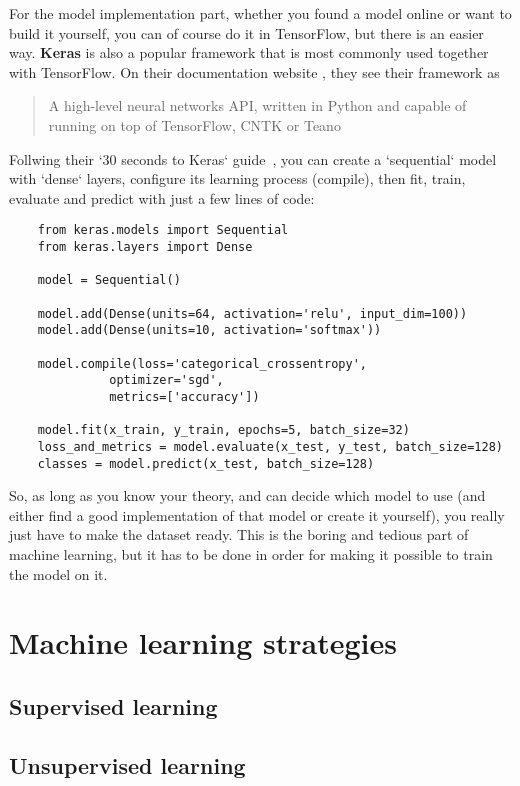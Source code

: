 For the model implementation part, whether you found a model online or want to build it yourself, you can of course do 
it in TensorFlow, but there is an easier way. \textbf{Keras} is also a popular framework that is most commonly used 
together with TensorFlow. On their documentation website \cite{keras_docs}, they see their framework as 
\blockquote{A high-level neural networks API, written in Python and capable of running on top of TensorFlow, CNTK or Teano}.

\newpage
\noindent Follwing their `30 seconds to Keras` guide \cite{keras_docs}, you can create a `sequential` model with `dense` 
layers, configure its learning process (compile), then fit, train, evaluate and predict with just a few lines of code: 

\begin{verbatim}
    from keras.models import Sequential
    from keras.layers import Dense

    model = Sequential()

    model.add(Dense(units=64, activation='relu', input_dim=100))
    model.add(Dense(units=10, activation='softmax'))

    model.compile(loss='categorical_crossentropy',
              optimizer='sgd',
              metrics=['accuracy'])
    
    model.fit(x_train, y_train, epochs=5, batch_size=32)
    loss_and_metrics = model.evaluate(x_test, y_test, batch_size=128)
    classes = model.predict(x_test, batch_size=128)
\end{verbatim}

\noindent So, as long as you know your theory, and can decide which model to use (and either find a good 
implementation of that model or create it yourself), you really just have to make the dataset ready. 
This is the boring and tedious part of machine learning, but it has to be done in order for making it possible to 
train the model on it. 

\newpage
\section{Machine learning strategies}
\subsection{Supervised learning}
\subsection{Unsupervised learning}
